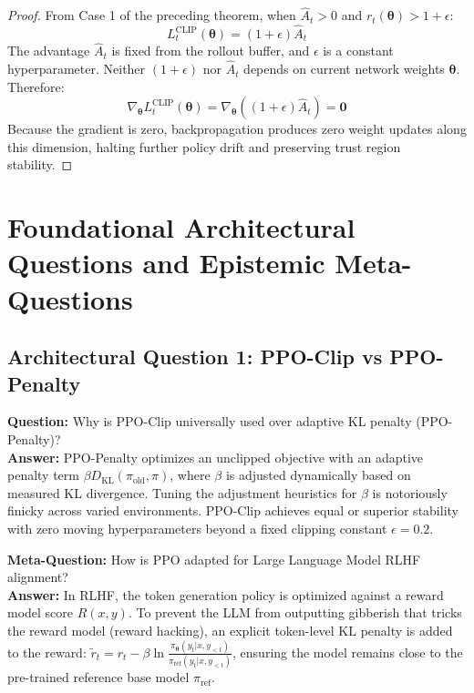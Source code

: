 \documentclass[11pt,a4paper]{article}
\theoremstyle{definition}
\begin{document}
\begin{proof}
From Case 1 of the preceding theorem, when $\widehat{A}_t > 0$ and $r_t(\boldsymbol{\theta}) > 1 + \epsilon$:
{\boldmath
\begin{equation}
L_t^{\text{CLIP}}(\boldsymbol{\theta}) = (1 + \epsilon) \widehat{A}_t
\end{equation}
}
The advantage $\widehat{A}_t$ is fixed from the rollout buffer, and $\epsilon$ is a constant hyperparameter.
Neither $(1 + \epsilon)$ nor $\widehat{A}_t$ depends on current network weights $\boldsymbol{\theta}$.
Therefore:
{\boldmath
\begin{equation}
\nabla_{\boldsymbol{\theta}} L_t^{\text{CLIP}}(\boldsymbol{\theta}) = \nabla_{\boldsymbol{\theta}} \left( (1 + \epsilon) \widehat{A}_t \right) = \mathbf{0}
\end{equation}
}
Because the gradient is zero, backpropagation produces zero weight updates along this dimension, halting further policy drift and preserving trust region stability.
\end{proof}

\section{Foundational Architectural Questions and Epistemic Meta-Questions}

\subsection{Architectural Question 1: PPO-Clip vs PPO-Penalty}
\textbf{Question:} Why is PPO-Clip universally used over adaptive KL penalty (PPO-Penalty)?\\
\textbf{Answer:} PPO-Penalty optimizes an unclipped objective with an adaptive penalty term $\beta D_{\text{KL}}(\pi_{\text{old}}, \pi)$, where $\beta$ is adjusted dynamically based on measured KL divergence. Tuning the adjustment heuristics for $\beta$ is notoriously finicky across varied environments. PPO-Clip achieves equal or superior stability with zero moving hyperparameters beyond a fixed clipping constant $\epsilon = 0.2$.

\textbf{Meta-Question:} How is PPO adapted for Large Language Model RLHF alignment?\\
\textbf{Answer:} In RLHF, the token generation policy is optimized against a reward model score $R(x, y)$. To prevent the LLM from outputting gibberish that tricks the reward model (reward hacking), an explicit token-level KL penalty is added to the reward: $\widetilde{r}_t = r_t - \beta \ln \frac{\pi_{\boldsymbol{\theta}}(y_t | x, y_{<t})}{\pi_{\text{ref}}(y_t | x, y_{<t})}$, ensuring the model remains close to the pre-trained reference base model $\pi_{\text{ref}}$.
\end{document}
